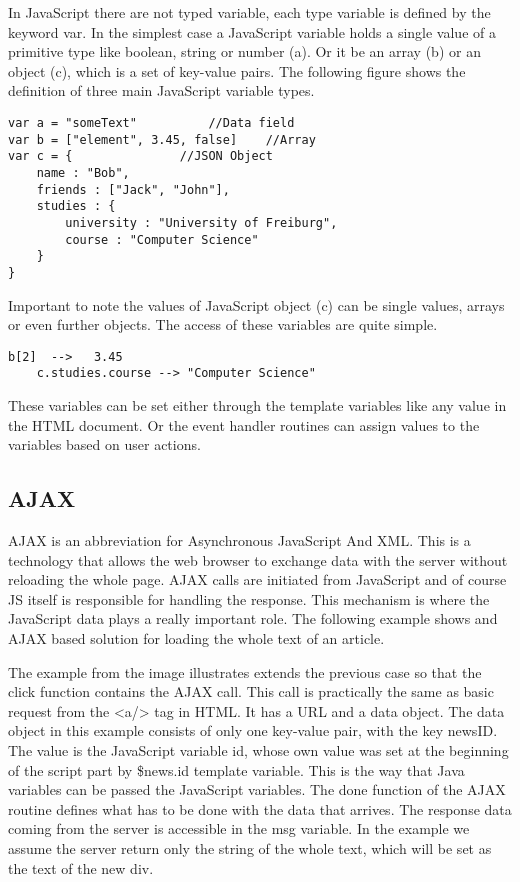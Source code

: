 In JavaScript there are not typed variable, each type variable is defined by the keyword var. In the simplest case a JavaScript variable holds a single value of a  primitive type like boolean, string or number (a). Or it be an array (b) or an object (c), which is a set of key-value pairs. The following figure shows the definition of three main JavaScript variable types.


\begin{lstlisting}[basicstyle=\footnotesize, frame=single, caption={JavaScript data types}, captionpos=b]
var a = "someText"			//Data field
var b = ["element", 3.45, false]	//Array
var c = {				//JSON Object
	name : "Bob",
	friends : ["Jack", "John"],
	studies : {
		university : "University of Freiburg",
		course : "Computer Science"
	}		
}
\end{lstlisting}

Important to note the values of JavaScript object (c) can be single values, arrays or even further objects. The access of these variables are quite simple.

\begin{lstlisting}[basicstyle=\footnotesize, frame=single, caption={JavaScript data access}, captionpos=b]
	b[2]  -->   3.45
	c.studies.course --> "Computer Science"
\end{lstlisting}


These variables can be set either through the template variables like any value in the HTML document. Or the event handler routines can assign values to the variables based on user actions.

\subsection{AJAX}

AJAX is an abbreviation for Asynchronous JavaScript And XML. This is a technology that allows the web browser to exchange data with the server without reloading the whole page. AJAX calls are initiated from JavaScript and of course JS itself is responsible for handling the response. This mechanism is where the JavaScript data plays a really important role. The following example shows and AJAX based solution for loading the whole text of an article.


The example from the image illustrates extends the previous case so that the click function contains the AJAX call. This call is practically the same as basic request from the <a/> tag in HTML. It has a URL and a data object. The data object in this example consists of only one key-value pair, with the key newsID. The value is the JavaScript variable id, whose own value was set at the beginning of the script part by \${news.id} template variable. This is the way that Java variables can be passed the JavaScript variables.  The done function of the AJAX routine defines what has to be done with the data that arrives. The response data coming from the server is accessible in the msg variable. In the example we assume the server return only the string of the whole text, which will be set as the text of the new div.


